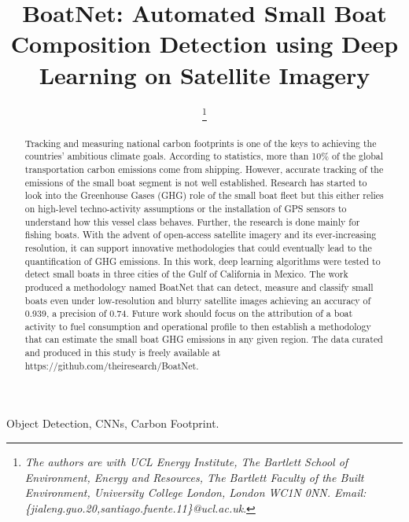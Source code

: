 \documentclass[lettersize,journal]{IEEEtran}
\begin{document}
\title{BoatNet: Automated Small Boat Composition Detection using Deep Learning on Satellite Imagery}

\author{

\thanks{\textit{
The authors are with UCL Energy Institute, The Bartlett School of Environment, Energy and Resources, The Bartlett Faculty of the Built Environment, University College London, London WC1N 0NN. Email: \{jialeng.guo.20,santiago.fuente.11\}@ucl.ac.uk}.} 
}



\maketitle

\begin{abstract}
Tracking and measuring national carbon footprints is one of the keys to achieving the countries' ambitious climate goals. According to statistics, more than 10\% of the global transportation carbon emissions come from shipping. However, accurate tracking of the emissions of the small boat segment is not well established. Research has started to look into the Greenhouse Gases (GHG) role of the small boat fleet but this either relies on high-level techno-activity assumptions or the installation of GPS sensors to understand how this vessel class behaves. Further, the research is done mainly for fishing boats. With the advent of open-access satellite imagery and its ever-increasing resolution, it can support innovative methodologies that could eventually lead to the quantification of GHG emissions. In this work, deep learning algorithms were tested to detect small boats in three cities of the Gulf of California in Mexico. The work produced a methodology named BoatNet that can detect, measure and classify small boats even under low-resolution and blurry satellite images achieving an accuracy of 0.939, a precision of 0.74. Future work should focus on the attribution of a boat activity to fuel consumption and operational profile to then establish a methodology that can estimate the small boat GHG emissions in any given region. The data curated and produced in this study is freely available at https://github.com/theiresearch/BoatNet.
\end{abstract}


\begin{IEEEkeywords}
Object Detection, CNNs, Carbon Footprint.
\end{IEEEkeywords}
\end{document}
